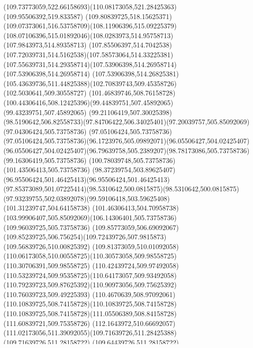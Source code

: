{{		\curveto(109.73773059,522.66158693)(110.08173058,521.28425363)(109.95506392,519.833587)
		\curveto(109.80839725,518.15625371)(109.07373061,516.53758709)(108.11906396,515.09225379)
		\curveto(108.07106396,515.01892046)(108.0283973,514.95758713)(107.9843973,514.89358713)
		\curveto(107.85506397,514.7042538)(107.72039731,514.5162538)(107.58573064,514.33225381)
		\curveto(107.55639731,514.29358714)(107.53906398,514.26958714)(107.53906398,514.26958714)
		\lineto(107.53906398,514.26825381)
		\curveto(105.43639736,511.44825388)(102.70839743,509.45358726)(102.5030641,509.30558727)
		\curveto(101.46839746,508.76158728)(100.44306416,508.12425396)(99.44839751,507.45892065)
		\lineto(99.43239751,507.45892065)
		\lineto(99.21106419,507.30025398)
		\curveto(98.5190642,506.82558733)(97.84706422,506.34025401)(97.20039757,505.85092069)
		\lineto(97.04306424,505.73758736)
		\lineto(97.05106424,505.73758736)
		\curveto(97.05106424,505.73758736)(96.1723976,505.09892071)(96.05506427,504.02425407)
		\curveto(96.05506427,504.02425407)(96.79639758,505.2389207)(98.78173086,505.73758736)
		\lineto(99.16306419,505.73758736)
		\lineto(100.78039748,505.73758736)
		\lineto(101.43506413,505.73758736)
		\curveto(98.37239754,503.89625407)(96.95506424,501.46425413)(96.95506424,501.46425413)
		\curveto(97.85373089,501.07225414)(98.5310642,500.0815875)(98.5310642,500.0815875)
		\curveto(97.93239755,502.03892078)(99.59106418,503.59625408)(101.31239747,504.64158738)
		\curveto(101.46306413,504.70958738)(103.99906407,505.85092069)(106.14306401,505.73758736)
		\lineto(109.96039725,505.73758736)
		\lineto(109.85773059,506.69092067)
		\curveto(109.85239725,506.756254)(109.72439726,507.9815873)(109.56839726,510.00825392)
		\curveto(109.81373059,510.01092058)(110.06173058,510.00558725)(110.30573058,509.98558725)
		\lineto(110.30706391,509.98558725)
		\curveto(110.42439724,509.97492058)(110.53239724,509.95358725)(110.64173057,509.93492058)
		\curveto(110.79239723,509.87625392)(110.90973056,509.75625392)(110.76039723,509.49225393)
		\curveto(110.4670639,508.97092061)(110.10839725,508.74158728)(110.10839725,508.74158728)
		\curveto(110.10839725,508.74158728)(111.05506389,508.84158728)(111.60839721,509.75358726)
		\curveto(112.1643972,510.66692057)(111.02173056,511.39092055)(109.71639726,511.28425388)
		\lineto(109.71639726,511.28158722)
		\curveto(109.64439726,511.28158722)(109.55639726,511.27358722)(109.47639726,511.26958722)
		\curveto(109.40706393,512.24692053)(109.33506393,513.3509205)(109.26706393,514.56292047)
		\curveto(110.26573058,516.11892043)(111.03773056,517.87092039)(111.20173055,519.71892034)
}}
